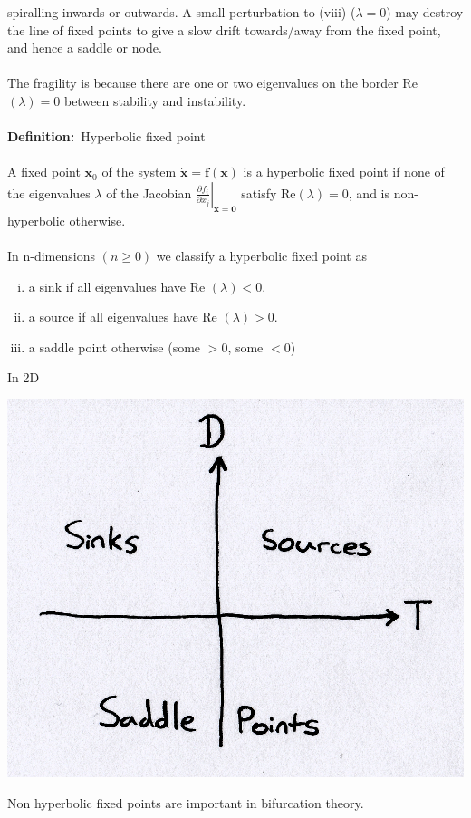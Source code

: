 \documentclass{article}
\newcommand{\definition}{\textbf{Definition:}}              %
\begin{document}
spiralling inwards or outwards. A small perturbation to (viii) ($\lambda = 0$) 
may destroy the line of fixed points to give a slow drift towards/away from the
fixed point, and hence a saddle or node.
\\
\\
The fragility is because there are one or two eigenvalues on the border
Re$(\lambda) = 0$ between stability and instability.
\\
\\
\definition\ Hyperbolic fixed point
\\
\\
A fixed point $\bm{x}_0$ of the system $\dot{\bm{x}} = \bm{f}(\bm{x})$ is a
hyperbolic fixed point if none of the eigenvalues $\lambda$ of the Jacobian
$ \left. \frac{\partial f_i}{\partial x_j} \right| _{\bm{x} = \bm{0}} $ satisfy
Re$(\lambda) = 0$, and is non-hyperbolic otherwise.
\\
\\
In n-dimensions $(n \geq 0)$ we classify a hyperbolic fixed point as
\begin{enumerate}[(i)]
\item a sink if all eigenvalues have Re $(\lambda) < 0$.
\item a source if all eigenvalues have Re $(\lambda) > 0$.
\item a saddle point otherwise (some $>0$, some $<0$)
\end{enumerate}
In 2D
\begin{center}
\includegraphics[scale = 0.15]{Diagram2.png}
\end{center}
Non hyperbolic fixed points are important in bifurcation theory.
\\
\end{document}

